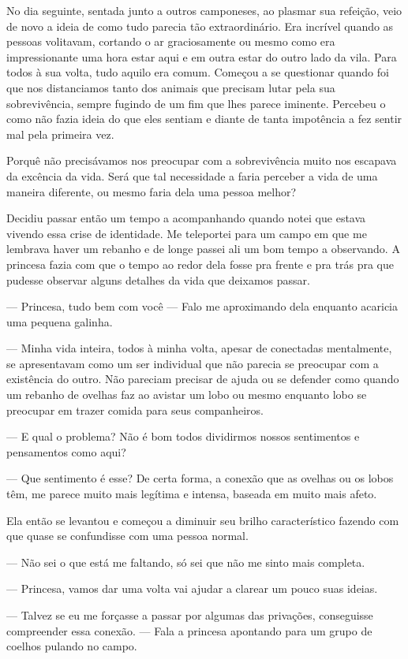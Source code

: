 No dia seguinte, sentada junto a outros camponeses, ao plasmar sua refeição, veio de novo a ideia de como tudo parecia tão extraordinário. Era incrível quando as pessoas volitavam, cortando o ar graciosamente ou mesmo como era impressionante uma hora estar aqui e em outra estar do outro lado da vila. Para todos à sua volta, tudo aquilo era comum. Começou a se questionar quando foi que nos distanciamos tanto dos animais que precisam lutar pela sua sobrevivência, sempre fugindo de um fim que lhes parece iminente. Percebeu o como não fazia ideia do que eles sentiam e diante de tanta impotência a fez sentir mal pela primeira vez.

Porquê não precisávamos nos preocupar com a sobrevivência muito nos escapava da excência da vida. Será que tal necessidade a faria perceber a vida de uma maneira diferente, ou mesmo faria dela uma pessoa melhor?

Decidiu passar então um tempo a acompanhando quando notei que estava vivendo essa crise de identidade. Me teleportei para um campo em que me lembrava haver um rebanho e de longe passei ali um bom tempo a observando. A princesa fazia com que o tempo ao redor dela fosse pra frente e pra trás pra que pudesse observar alguns detalhes da vida que deixamos passar.

— Princesa, tudo bem com você — Falo me aproximando dela enquanto acaricia uma pequena galinha.

— Minha vida inteira, todos à minha volta, apesar de conectadas mentalmente, se apresentavam como um ser individual que não parecia se preocupar com a existência do outro. Não pareciam precisar de ajuda ou se defender como quando um rebanho de ovelhas faz ao avistar um lobo ou mesmo enquanto lobo se preocupar em trazer comida para seus companheiros.

— E qual o problema? Não é bom todos dividirmos nossos sentimentos e pensamentos como aqui?

— Que sentimento é esse? De certa forma, a conexão que as ovelhas ou os lobos têm, me parece muito mais legítima e intensa, baseada em muito mais afeto.

Ela então se levantou e começou a diminuir seu brilho característico fazendo com que quase se confundisse com uma pessoa normal.

— Não sei o que está me faltando, só sei que não me sinto mais completa.

— Princesa, vamos dar uma volta vai ajudar a clarear um pouco suas ideias.

— Talvez se eu me forçasse a passar por algumas das privações, conseguisse compreender essa conexão. — Fala a princesa apontando para um grupo de coelhos pulando no campo.


